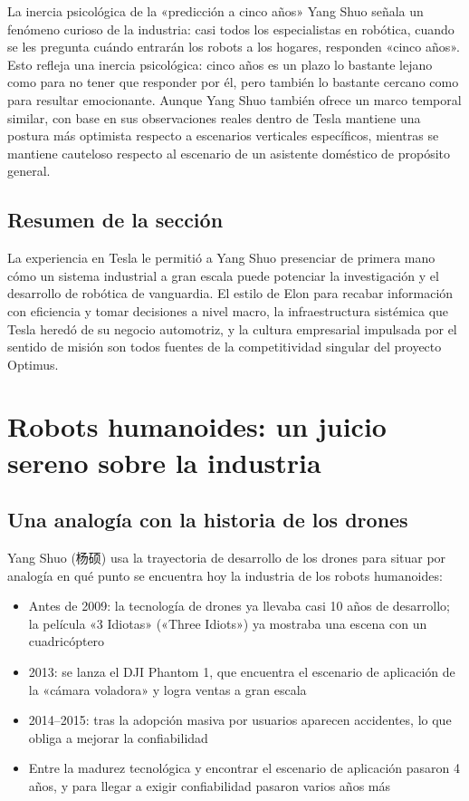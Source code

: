 \documentclass[a4paper]{article}
\begin{document}
\begin{knowledgebox}{La inercia psicológica de la «predicción a cinco años»}
Yang Shuo señala un fenómeno curioso de la industria: casi todos los especialistas en robótica, cuando se les pregunta cuándo entrarán los robots a los hogares, responden «cinco años». Esto refleja una inercia psicológica: cinco años es un plazo lo bastante lejano como para no tener que responder por él, pero también lo bastante cercano como para resultar emocionante. Aunque Yang Shuo también ofrece un marco temporal similar, con base en sus observaciones reales dentro de Tesla mantiene una postura más optimista respecto a escenarios verticales específicos, mientras se mantiene cauteloso respecto al escenario de un asistente doméstico de propósito general.
\end{knowledgebox}

\subsection{Resumen de la sección}

La experiencia en Tesla le permitió a Yang Shuo presenciar de primera mano cómo un sistema industrial a gran escala puede potenciar la investigación y el desarrollo de robótica de vanguardia. El estilo de Elon para recabar información con eficiencia y tomar decisiones a nivel macro, la infraestructura sistémica que Tesla heredó de su negocio automotriz, y la cultura empresarial impulsada por el sentido de misión son todos fuentes de la competitividad singular del proyecto Optimus.
\section{Robots humanoides: un juicio sereno sobre la industria}

\subsection{Una analogía con la historia de los drones}

Yang Shuo (杨硕) usa la trayectoria de desarrollo de los drones para situar por analogía en qué punto se encuentra hoy la industria de los robots humanoides:

\begin{itemize}
    \item Antes de 2009: la tecnología de drones ya llevaba casi 10 años de desarrollo; la película «3 Idiotas» («Three Idiots») ya mostraba una escena con un cuadricóptero
    \item 2013: se lanza el DJI Phantom 1, que encuentra el escenario de aplicación de la «cámara voladora» y logra ventas a gran escala
    \item 2014--2015: tras la adopción masiva por usuarios aparecen accidentes, lo que obliga a mejorar la confiabilidad
    \item Entre la madurez tecnológica y encontrar el escenario de aplicación pasaron 4 años, y para llegar a exigir confiabilidad pasaron varios años más
\end{itemize}
\end{document}
